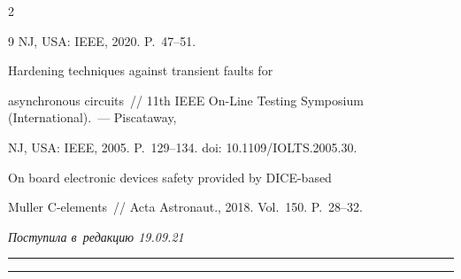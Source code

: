 \begin{multicols}{2}
{{\begin{thebibliography}{9}
NJ, USA: IEEE, 2020. P.~47--51.



 


   Hardening techniques against transient faults for 

asynchronous circuits~// 11th IEEE On-Line Testing Symposium (International).~--- Piscataway, 

NJ, USA: IEEE, 2005. P.~129--134. doi: 10.1109/IOLTS.2005.30.




 On board electronic devices safety provided by DICE-based 

Muller C-elements~// Acta Astronaut., 2018. Vol.~150. P.~28--32.

{



}

\end{thebibliography}



 }

 }



\end{multicols}



\vspace*{-10pt}



\hfill{\small\textit{Поступила в~редакцию 19.09.21}}



\vspace*{6pt}












\hrule



\vspace*{2pt}



\hrule






